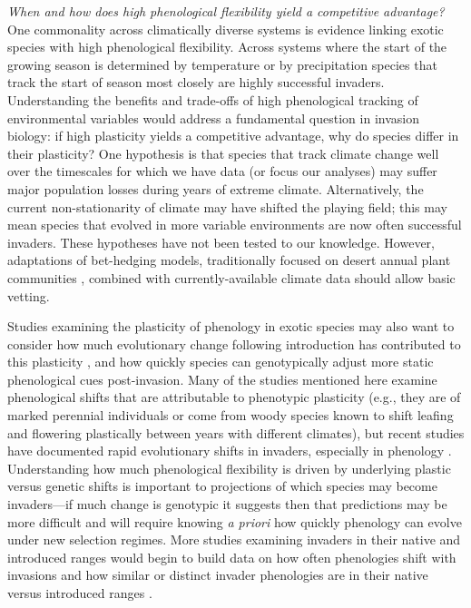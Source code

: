 \documentclass[11pt,a4paper,oneside]{article}
\begin{document}
\noindent \emph{When and how does high phenological flexibility yield a competitive advantage?}\\
\noindent  One commonality across climatically diverse systems is evidence linking exotic species with high phenological flexibility. Across systems where the start of the growing season is determined by temperature \citep{wolkovichAmBot2013} or by precipitation \citep{Wainwright:2012tw} species that track the start of season most closely are highly successful invaders. Understanding the benefits and trade-offs of high phenological tracking of environmental variables would address a fundamental question in invasion biology: if high plasticity yields a competitive advantage, why do species differ in their plasticity? One hypothesis is that species that track climate change well over the timescales for which we have data (or focus our analyses) may suffer major population losses during years of extreme climate. Alternatively, the current non-stationarity of climate may have shifted the playing field; this may mean species that evolved in more variable environments are now often successful invaders. These hypotheses have not been tested to our knowledge. However, adaptations of bet-hedging models, traditionally focused on desert annual plant communities \citep[e.g.,][]{donald2013}, combined with currently-available climate data should allow basic vetting. 

Studies examining the plasticity of phenology in exotic species may also want to consider how much evolutionary change following introduction has contributed to this plasticity \citep[e.g.,][]{sultan2013}, and how quickly species can genotypically adjust more static phenological cues post-invasion. Many of the studies mentioned here examine phenological shifts that are attributable to phenotypic plasticity (e.g., they are of marked perennial individuals or come from woody species known to shift leafing and flowering plastically between years with different climates), but recent studies have documented rapid evolutionary shifts in invaders, especially in phenology \citep[e.g.,][]{Colautti:2011,konarz2012,novy2012}. Understanding how much phenological flexibility is driven by underlying plastic versus genetic shifts is important to projections of which species may become invaders---if much change is genotypic it suggests then that predictions may be more difficult and will require knowing \emph{a priori} how quickly phenology can evolve under new selection regimes. More studies examining invaders in their native and introduced ranges \citep[e.g.,][]{Godoy:2009dz,matesanz2012} would begin to build data on how often phenologies shift with invasions and how similar or distinct invader phenologies are in their native versus introduced ranges \citep[e.g.,][]{wolkovichAmBot2013}.\\
\end{document}
